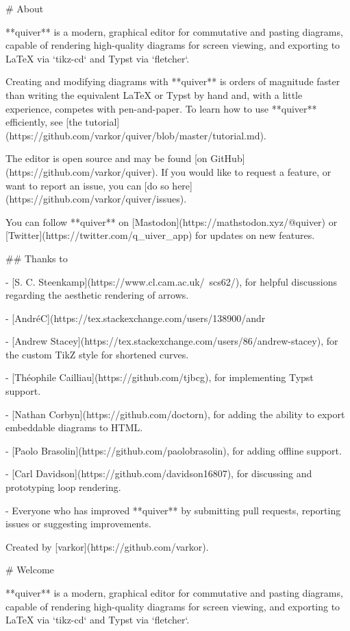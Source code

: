 \documentclass[preview]{standalone}
\begin{document}
# About

**quiver** is a modern, graphical editor for commutative and pasting diagrams, capable of rendering high-quality diagrams for screen viewing, and exporting to LaTeX via `tikz-cd` and Typst via `fletcher`.

Creating and modifying diagrams with **quiver** is orders of magnitude faster than writing the equivalent LaTeX or Typst by hand and, with a little experience, competes with pen-and-paper. To learn how to use **quiver** efficiently, see [the tutorial](https://github.com/varkor/quiver/blob/master/tutorial.md).

The editor is open source and may be found [on GitHub](https://github.com/varkor/quiver). If you would like to request a feature, or want to report an issue, you can [do so here](https://github.com/varkor/quiver/issues).

You can follow **quiver** on [Mastodon](https://mathstodon.xyz/@quiver) or [Twitter](https://twitter.com/q_uiver_app) for updates on new features.

## Thanks to

- [S. C. Steenkamp](https://www.cl.cam.ac.uk/~scs62/), for helpful discussions regarding the aesthetic rendering of arrows.

- [AndréC](https://tex.stackexchange.com/users/138900/andr%

- [Andrew Stacey](https://tex.stackexchange.com/users/86/andrew-stacey), for the custom TikZ style for shortened curves.

- [Théophile Cailliau](https://github.com/tjbcg), for implementing Typst support.

- [Nathan Corbyn](https://github.com/doctorn), for adding the ability to export embeddable diagrams to HTML.

- [Paolo Brasolin](https://github.com/paolobrasolin), for adding offline support.

- [Carl Davidson](https://github.com/davidson16807), for discussing and prototyping loop rendering.

- Everyone who has improved **quiver** by submitting pull requests, reporting issues or suggesting improvements.

Created by [varkor](https://github.com/varkor).

# Welcome

**quiver** is a modern, graphical editor for commutative and pasting diagrams, capable of rendering high-quality diagrams for screen viewing, and exporting to LaTeX via `tikz-cd` and Typst via `fletcher`.
\end{document}
